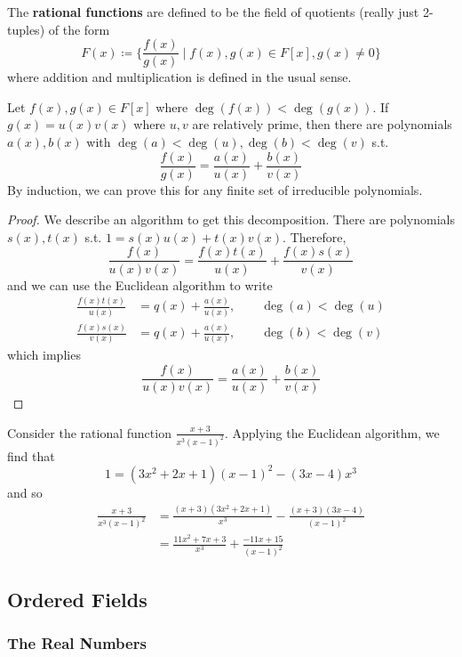   \begin{definition}
    The \textbf{rational functions} are defined to be the field of quotients (really just 2-tuples) of the form 
    \begin{equation}
      F(x) \coloneqq \bigg\{ \frac{f(x)}{g(x)} \; \bigg| \; f(x), g(x) \in F[x], g(x) \neq 0 \bigg\}
    \end{equation}
    where addition and multiplication is defined in the usual sense.
  \end{definition}

  \begin{theorem}
    Let $f(x), g(x) \in F[x]$ where $\deg(f(x)) < \deg(g(x))$. If $g(x) = u(x) v(x)$ where $u, v$ are relatively prime, then there are polynomials $a(x), b(x)$ with $\deg(a) < \deg(u), \deg(b) < \deg(v)$ s.t. 
    \begin{equation}
      \frac{f(x)}{g(x)} = \frac{a(x)}{u(x)} + \frac{b(x)}{v(x)}
    \end{equation}
    By induction, we can prove this for any finite set of irreducible polynomials. 
  \end{theorem}
  \begin{proof}
    We describe an algorithm to get this decomposition. There are polynomials $s(x), t(x)$ s.t. $1 = s(x) u(x) + t(x) v(x)$. Therefore, 
    \begin{equation}
      \frac{f(x)}{ u(x) v(x)} = \frac{f(x) t(x)}{u(x)} + \frac{f(x) s(x)}{v(x)}
    \end{equation}
    and we can use the Euclidean algorithm to write 
    \begin{align}
      \frac{f(x) t(x)}{u(x)} & = q(x) + \frac{a(x)}{u(x)}, \qquad \deg(a) < \deg(u) \\
      \frac{f(x) s(x)}{v(x)} & = q(x) + \frac{a(x)}{u(x)}, \qquad \deg(b) < \deg(v)
    \end{align}
    which implies 
    \begin{equation}
      \frac{f(x)}{u(x) v(x)} = \frac{a(x)}{u(x)} + \frac{b(x)}{v(x)}
    \end{equation}
  \end{proof}

  \begin{example}
    Consider the rational function $\frac{x + 3}{x^3 (x - 1)^2}$. Applying the Euclidean algorithm, we find that 
    \begin{equation}
      1 = (3x^2 + 2x + 1) (x - 1)^2 - (3x - 4) x^3
    \end{equation}
    and so 
    \begin{align}
      \frac{x + 3}{x^3 (x - 1)^2} & = \frac{(x + 3)(3x^2 + 2x + 1)}{x^3} - \frac{(x + 3)(3x - 4)}{(x - 1)^2} \\
                                  & = \frac{11x^2 + 7x + 3}{x^3} + \frac{-11x + 15}{(x - 1)^2}
    \end{align}
  \end{example}

\subsection{Ordered Fields}

\subsubsection{The Real Numbers}

